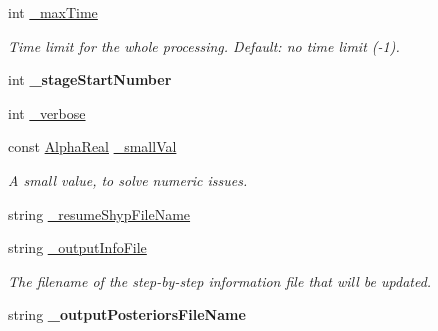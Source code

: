 \begin{DoxyCompactItemize}
\item 
\hypertarget{classMultiBoost_1_1VJCascadeLearner_ad3c9cbb91dca52abd9a99e0571afd614}{int \hyperlink{classMultiBoost_1_1VJCascadeLearner_ad3c9cbb91dca52abd9a99e0571afd614}{\-\_\-max\-Time}}\label{classMultiBoost_1_1VJCascadeLearner_ad3c9cbb91dca52abd9a99e0571afd614}

\begin{DoxyCompactList}\small\item\em Time limit for the whole processing. Default\-: no time limit (-\/1). \end{DoxyCompactList}\item 
\hypertarget{classMultiBoost_1_1VJCascadeLearner_a444e0e5ec004750af5ba2048ea79dc90}{int {\bfseries \-\_\-stage\-Start\-Number}}\label{classMultiBoost_1_1VJCascadeLearner_a444e0e5ec004750af5ba2048ea79dc90}

\item 
int \hyperlink{classMultiBoost_1_1VJCascadeLearner_a28381536dfa8fd6b11993902a5b16bea}{\-\_\-verbose}
\item 
\hypertarget{classMultiBoost_1_1VJCascadeLearner_aecfd82f72c0a0bd963c5b3c5ca98f7f8}{const \hyperlink{Defaults_8h_a80184c4fd10ab70a1a17c5f97dcd1563}{Alpha\-Real} \hyperlink{classMultiBoost_1_1VJCascadeLearner_aecfd82f72c0a0bd963c5b3c5ca98f7f8}{\-\_\-small\-Val}}\label{classMultiBoost_1_1VJCascadeLearner_aecfd82f72c0a0bd963c5b3c5ca98f7f8}

\begin{DoxyCompactList}\small\item\em A small value, to solve numeric issues. \end{DoxyCompactList}\item 
string \hyperlink{classMultiBoost_1_1VJCascadeLearner_af2753ac93b04cd7d77dd584c93a5fe89}{\-\_\-resume\-Shyp\-File\-Name}
\item 
\hypertarget{classMultiBoost_1_1VJCascadeLearner_a60b4d842256c138480d523dda4b0ae08}{string \hyperlink{classMultiBoost_1_1VJCascadeLearner_a60b4d842256c138480d523dda4b0ae08}{\-\_\-output\-Info\-File}}\label{classMultiBoost_1_1VJCascadeLearner_a60b4d842256c138480d523dda4b0ae08}

\begin{DoxyCompactList}\small\item\em The filename of the step-\/by-\/step information file that will be updated. \end{DoxyCompactList}\item 
\hypertarget{classMultiBoost_1_1VJCascadeLearner_a8fdcfbc909d7f53451598ba66dd73302}{string {\bfseries \-\_\-output\-Posteriors\-File\-Name}}\label{classMultiBoost_1_1VJCascadeLearner_a8fdcfbc909d7f53451598ba66dd73302}


\end{DoxyCompactItemize}
